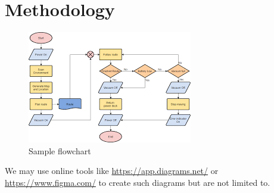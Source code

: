\section{Methodology}


\begin{figure}[H]
    \centering
    \includegraphics[width=0.5\linewidth]{Images/flow.png}
    \caption{Sample flowchart}
    \label{fig:sample-flowchart}
\end{figure}

We may use online tools like \url{https://app.diagrams.net/} or \url{https://www.figma.com/} to create such diagrams but are not limited to.

